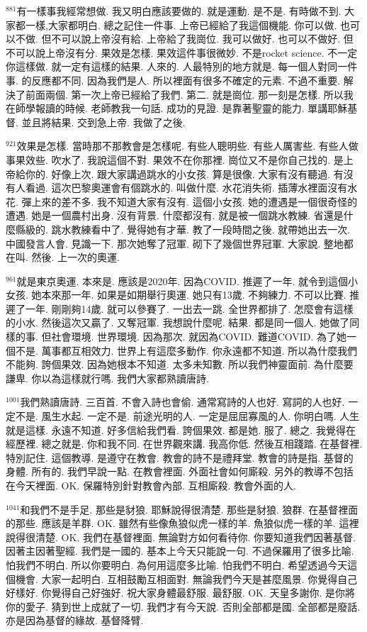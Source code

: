 \documentclass{book}
\begin{document}
$^{881}$有一樣事我經常想做.
我又明白應該要做的.
就是運動.
是不是.
有時做不到.
大家都一樣,大家都明白.
總之記住一件事.
上帝已經給了我這個機能.
你可以做.
也可以不做.
但不可以說上帝沒有給.
上帝給了我崗位.
我可以做好.
也可以不做好.
但不可以說上帝沒有分.
果效是怎樣.
果效這件事很微妙.
不是rocket science.
不一定你這樣做.
就一定有這樣的結果.
人來的.
人最特別的地方就是.
每一個人對同一件事.
的反應都不同.
因為我們是人.
所以裡面有很多不確定的元素.
不過不重要.
解決了前面兩個.
第一次上帝已經給了我們.
第二.
就是崗位.
那一刻是怎樣.
所以我在師學報讀的時候.
老師教我一句話.
成功的見證.
是靠著聖靈的能力.
單講耶穌基督.
並且將結果.
交到急上帝.
我做了之後.

$^{921}$效果是怎樣.
當時那不那教會是怎樣呢.
有些人聰明些.
有些人厲害些.
有些人做事果效些.
吹水了.
我說這個不對.
果效不在你那裡.
崗位又不是你自己找的.
是上帝給你的.
好像上次.
跟大家講過跳水的小女孩.
算是很像.
大家有沒有聽過.
有沒有人看過.
這次巴黎奧運會有個跳水的.
叫做什麼.
水花消失術.
插薄水裡面沒有水花.
彈上來的差不多.
我不知道大家有沒有.
這個小女孩.
她的遭遇是一個很奇怪的遭遇.
她是一個農村出身.
沒有背景.
什麼都沒有.
就是被一個跳水教練.
省還是什麼縣級的.
跳水教練看中了.
覺得她有才華.
教了一段時間之後.
就帶她出去一次.
中國發言人會.
見識一下.
那次她奪了冠軍.
砌下了幾個世界冠軍.
大家說.
整地都在叫.
然後.
上一次的奧運.

$^{961}$就是東京奧運.
本來是.
應該是2020年.
因為COVID.
推遲了一年.
就令到這個小女孩.
她本來那一年.
如果是如期舉行奧運.
她只有13歲.
不夠練力.
不可以比賽.
推遲了一年.
剛剛夠14歲.
就可以參賽了.
一出去一跳.
全世界都排了.
怎麼會有這樣的小水.
然後這次又贏了.
又奪冠軍.
我想說什麼呢.
結果.
都是同一個人.
她做了同樣的事.
但社會環境.
世界環境.
因為那次.
就因為COVID.
難道COVID.
為了她一個不是.
萬事都互相效力.
世界上有這麼多動作.
你永遠都不知道.
所以為什麼我們不能夠.
誇個果效.
因為她根本不知道.
太多未知數.
所以我們神靈面前.
為什麼要謙卑.
你以為這樣就行嗎.
我們大家都熟讀唐詩.

$^{1001}$我們熟讀唐詩.
三百首.
不會入詩也會偷.
通常寫詩的人也好.
寫詞的人也好.
一定不是.
風生水起.
一定不是.
前途光明的人.
一定是屈屈寡風的人.
你明白嗎.
人生就是這樣.
永遠不知道.
好多信給我們看.
誇個果效.
都是她.
服了.
總之.
我覺得在經歷裡.
總之就是.
你和我不同.
在世界觀來講.
我高你低.
然後互相踐踏.
在基督裡.
特別記住.
這個教導.
是遵守在教會.
教會的詩不是禮拜堂.
教會的詩是指.
基督的身體.
所有的.
我們早說一點.
在教會裡面.
外面社會如何廝殺.
另外的教導不包括在今天裡面.
OK.
保羅特別針對教會內部.
互相廝殺.
教會外面的人.

$^{1041}$和我們不是手足.
那些是豺狼.
耶穌說得很清楚.
那些是豺狼.
狼群.
在基督裡面的那些.
應該是羊群.
OK.
雖然有些像魚狼似虎一樣的羊.
魚狼似虎一樣的羊.
這裡說得很清楚.
OK.
我們在基督裡面.
無論對方如何看待你.
你要知道我們因著基督.
因著主因著聖經.
我們是一國的.
基本上今天只能說一句.
不過保羅用了很多比喻.
怕我們不明白.
所以你要明白.
為何用這麼多比喻.
怕我們不明白.
希望透過今天這個機會.
大家一起明白.
互相鼓勵互相面對.
無論我們今天是甚麼風景.
你覺得自己好樣好.
你覺得自己好強好.
祝大家身體最舒服.
最舒服.
OK.
天皇多謝你.
是你將你的愛子.
猜到世上成就了一切.
我們才有今天說.
否則全部都是國.
全部都是廢話.
亦是因為基督的緣故.
基督降臂.
\end{document}
